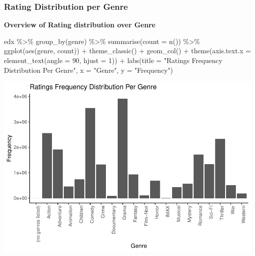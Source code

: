 \documentclass[
]{article}
\newenvironment{Shaded}{}{}
\newcommand{\AttributeTok}[1]{\textcolor[rgb]{0.49,0.56,0.16}{#1}}
\newcommand{\DecValTok}[1]{\textcolor[rgb]{0.25,0.63,0.44}{#1}}
\newcommand{\FunctionTok}[1]{\textcolor[rgb]{0.02,0.16,0.49}{#1}}
\newcommand{\NormalTok}[1]{#1}
\newcommand{\SpecialCharTok}[1]{\textcolor[rgb]{0.25,0.44,0.63}{#1}}
\newcommand{\StringTok}[1]{\textcolor[rgb]{0.25,0.44,0.63}{#1}}
\begin{document}
\hypertarget{rating-distribution-per-genre}{%
\subsubsection{Rating Distribution per
Genre}\label{rating-distribution-per-genre}}

\textbf{Overview of Rating distribution over Genre}

\begin{Shaded}
\begin{Highlighting}[]
\NormalTok{edx }\SpecialCharTok{\%\textgreater{}\%}
   \FunctionTok{group\_by}\NormalTok{(genre) }\SpecialCharTok{\%\textgreater{}\%}
   \FunctionTok{summarise}\NormalTok{(}\AttributeTok{count =} \FunctionTok{n}\NormalTok{()) }\SpecialCharTok{\%\textgreater{}\%}
   \FunctionTok{ggplot}\NormalTok{(}\FunctionTok{aes}\NormalTok{(genre, count)) }\SpecialCharTok{+}
   \FunctionTok{theme\_classic}\NormalTok{()  }\SpecialCharTok{+}
   \FunctionTok{geom\_col}\NormalTok{() }\SpecialCharTok{+}
   \FunctionTok{theme}\NormalTok{(}\AttributeTok{axis.text.x =} \FunctionTok{element\_text}\NormalTok{(}\AttributeTok{angle =} \DecValTok{90}\NormalTok{, }\AttributeTok{hjust =} \DecValTok{1}\NormalTok{)) }\SpecialCharTok{+}
   \FunctionTok{labs}\NormalTok{(}\AttributeTok{title =} \StringTok{"Ratings Frequency Distribution Per Genre"}\NormalTok{,}
        \AttributeTok{x =} \StringTok{"Genre"}\NormalTok{,}
        \AttributeTok{y =} \StringTok{"Frequency"}\NormalTok{)}
\end{Highlighting}
\end{Shaded}

\begin{center}\includegraphics{MovieLens-Project-Code_files/figure-latex/unnamed-chunk-29-1} \end{center}
\end{document}
